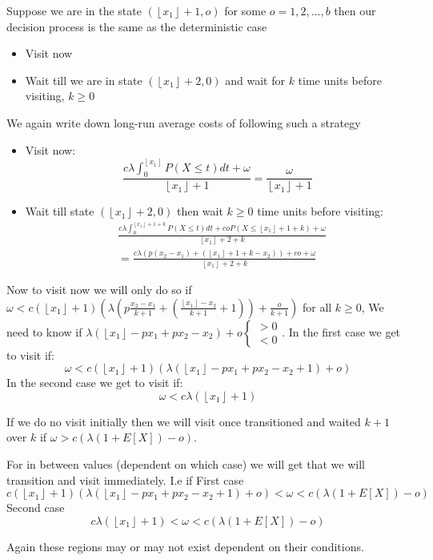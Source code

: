 \documentclass[a4paper,10pt]{article}
\newcommand{\floor}[1]{\left \lfloor #1 \right \rfloor}
\theoremstyle{definition}
\theoremstyle{definition}
\theoremstyle{remark}
\theoremstyle{definition}
\begin{document}
Suppose we are in the state $(\floor{x_{1}}+1,o)$ for some $o=1,2,...,b$ then our decision process is the same as the deterministic case
\begin{itemize}
\item Visit now
\item Wait till we are in state $(\floor{x_{1}}+2,0)$ and wait for $k$ time units before visiting, $k \geq 0$
\end{itemize}

We again write down long-run average costs of following such a strategy
\begin{itemize}
\item Visit now:
\begin{equation}
\frac{c \lambda \int_{0}^{\floor{x_{1}}} P(X \leq t) dt + \omega}{\floor{x_{1}}+1}=\frac{\omega}{\floor{x_{1}}+1}
\end{equation}
\item Wait till state $(\floor{x_{1}}+2,0)$ then wait $k \geq 0$ time units before visiting:
\begin{align}
&\frac{c \lambda \int_{0}^{\floor{x_{1}}+1+k} P(X \leq t) dt + coP(X \leq \floor{x_{1}}+1+k) +\omega }{\floor{x_{1}}+2+k} \nonumber \\ &=\frac{c \lambda (p(x_{2}-x_{1})+(\floor{x_{1}}+1+k-x_{2})) + co + \omega}{\floor{x_{1}}+2+k}
\end{align}
\end{itemize}

Now to visit now we will only do so if $\omega < c (\floor{x_{1}}+1) (\lambda (p\frac{x_{2}-x_{1}}{k+1}+ (\frac{\floor{x_{1}}-x_{2}}{k+1} +1))+\frac{o}{k+1})$ for all $k \geq 0$, We need to know if $\lambda (\floor{x_{1}}-px_{1}+px_{2}-x_{2})+o \begin{cases}
 >0 \\
 <0
\end{cases}$. 
In the first case we get to visit if:
\begin{equation}
\omega < c(\floor{x_{1}}+1)(\lambda (\floor{x_{1}}-px_{1}+px_{2}-x_{2}+1)+ o)
\end{equation}
In the second case we get to visit if:
\begin{equation}
\omega < c \lambda (\floor{x_{1}}+1)
\end{equation}



If we do no visit initially then we will visit once transitioned and waited $k+1$ over $k$ if $\omega > c (\lambda (1+E[X])-o)$.

For in between values (dependent on which case) we will get that we will transition and visit immediately.
I.e if
First case
\begin{equation}
c(\floor{x_{1}}+1)(\lambda (\floor{x_{1}}-px_{1}+px_{2}-x_{2}+1)+ o) < \omega < c (\lambda (1+E[X])-o) 
\end{equation}
Second case
\begin{equation}
c \lambda (\floor{x_{1}}+1) < \omega < c (\lambda (1+E[X])-o)
\end{equation}

Again these regions may or may not exist dependent on their conditions.
\end{document}
